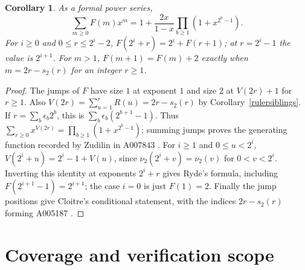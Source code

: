 \documentclass[11pt]{article}
\newtheorem{corollary}[theorem]{Corollary}
\newcommand{\vv}{\nu_2}
\begin{document}
\begin{corollary}\label{factorialidentities}
As a formal power series,
\[
 \sum_{m\ge0}F(m)x^m
 =1+\frac{2x}{1-x}\prod_{b\ge1}(1+x^{2^b-1}).
\]
For $i\ge0$ and $0\le r\le2^i-2$,
$F(2^i+r)=2^i+F(r+1)$; at $r=2^i-1$ the value is $2^{i+1}$.
For $m>1$, $F(m+1)=F(m)+2$ exactly when
$m=2r-s_2(r)$ for an integer $r\ge1$.
\end{corollary}
\begin{proof}
The jumps of $F$ have size $1$ at exponent $1$ and size $2$ at
$V(2r)+1$ for $r\ge1$. Also
$V(2r)=\sum_{u=1}^rR(u)=2r-s_2(r)$ by
Corollary~\ref{rulersiblings}. If $r=\sum_b\epsilon_b2^b$, this is
$\sum_b\epsilon_b(2^{b+1}-1)$. Thus
$\sum_{r\ge0}x^{V(2r)}=\prod_{b\ge1}(1+x^{2^b-1})$;
summing jumps proves the generating function recorded by Zudilin
in A007843 \cite{oeisF}. For $i\ge1$ and $0\le u<2^i$,
$V(2^i+u)=2^i-1+V(u)$, since $\vv(2^i+v)=\vv(v)$ for
$0<v<2^i$. Inverting this identity at exponents $2^i+r$ gives
Ryde's formula, including $F(2^{i+1}-1)=2^{i+1}$; the case
$i=0$ is just $F(1)=2$. Finally the jump positions give Cloitre's
conditional statement, with the indices $2r-s_2(r)$ forming
A005187 \cite{oeisF,oeisArrays}.
\end{proof}

\section{Coverage and verification scope}
\end{document}
